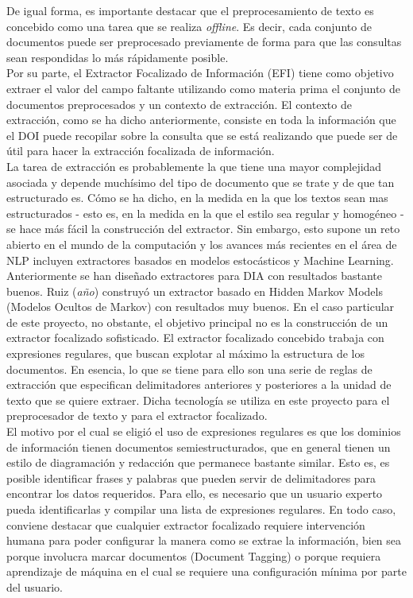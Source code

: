 De igual forma, es importante destacar que el preprocesamiento de texto es concebido como una tarea que se realiza \emph{offline}. Es decir, cada conjunto de documentos puede ser preprocesado previamente de forma para que las consultas sean respondidas lo más rápidamente posible. \\

Por su parte, el Extractor Focalizado de Información (EFI) tiene como objetivo extraer el valor del campo faltante utilizando como materia prima el conjunto de documentos preprocesados y un contexto de extracción. El contexto de extracción, como se ha dicho anteriormente, consiste en toda la información que el DOI puede recopilar sobre la consulta que se está realizando que puede ser de útil para hacer la extracción focalizada de información. \\

La tarea de extracción es probablemente la que tiene una mayor complejidad asociada y depende muchísimo del tipo de documento que se trate y de que tan estructurado es. Cómo se ha dicho, en la medida en la que los textos sean mas estructurados - esto es, en la medida en la que el estilo sea regular y homogéneo - se hace más fácil la construcción del extractor. Sin embargo, esto supone un reto abierto en el mundo de la computación y los avances más recientes en el área de NLP incluyen extractores basados en modelos estocásticos y Machine Learning. \\

Anteriormente se han diseñado extractores para DIA con resultados bastante buenos. Ruiz (\emph{año}) \cite{ruiz-HMM} construyó un extractor basado en Hidden Markov Models (Modelos Ocultos de Markov) con resultados muy buenos. En el caso particular de este proyecto, no obstante, el objetivo principal no es la construcción de un extractor focalizado sofisticado. El extractor focalizado concebido trabaja con expresiones regulares, que buscan explotar al máximo la estructura de los documentos. En esencia, lo que se tiene para ello son una serie de reglas de extracción que especifican delimitadores anteriores y posteriores a la unidad de texto que se quiere extraer. Dicha tecnología se utiliza en este proyecto para el preprocesador de texto y para el extractor focalizado.\\

El motivo por el cual se eligió el uso de expresiones regulares es que los dominios de información tienen documentos semiestructurados,  que en general tienen un estilo de diagramación y redacción que permanece bastante similar. Esto es, es posible identificar frases y palabras que pueden servir de delimitadores para encontrar los datos requeridos. Para ello, es necesario que un usuario experto pueda identificarlas y compilar una lista de expresiones regulares. En todo caso, conviene destacar que cualquier extractor focalizado requiere intervención humana para poder configurar la manera como se extrae la información, bien sea porque involucra marcar documentos (Document Tagging) o porque requiera aprendizaje de máquina en el cual se requiere una configuración mínima por parte del usuario.\\


